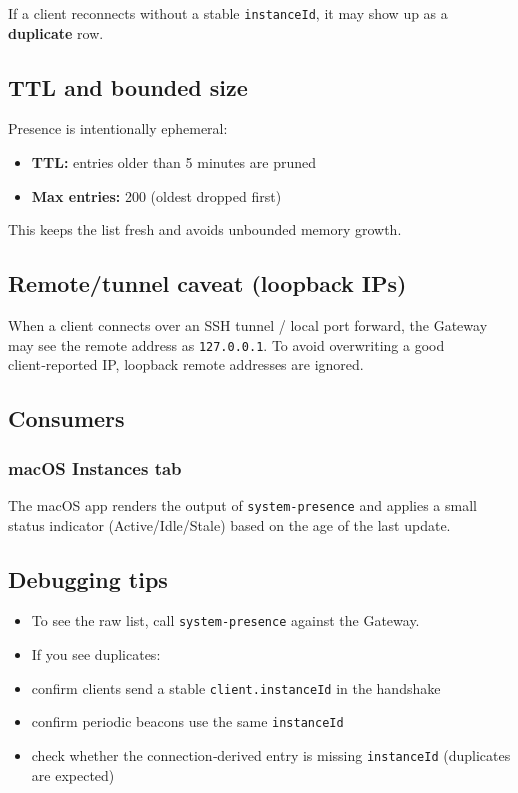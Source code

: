 If a client reconnects without a stable \texttt{instanceId}, it may show up as a
\textbf{duplicate} row.

\subsection{TTL and bounded size}


Presence is intentionally ephemeral:

\begin{itemize}
  \item \textbf{TTL:} entries older than 5 minutes are pruned
  \item \textbf{Max entries:} 200 (oldest dropped first)
\end{itemize}


This keeps the list fresh and avoids unbounded memory growth.

\subsection{Remote/tunnel caveat (loopback IPs)}


When a client connects over an SSH tunnel / local port forward, the Gateway may
see the remote address as \texttt{127.0.0.1}. To avoid overwriting a good client‑reported
IP, loopback remote addresses are ignored.

\subsection{Consumers}


\subsubsection{macOS Instances tab}


The macOS app renders the output of \texttt{system-presence} and applies a small status
indicator (Active/Idle/Stale) based on the age of the last update.

\subsection{Debugging tips}


\begin{itemize}
  \item To see the raw list, call \texttt{system-presence} against the Gateway.
  \item If you see duplicates:
  \item confirm clients send a stable \texttt{client.instanceId} in the handshake
  \item confirm periodic beacons use the same \texttt{instanceId}
  \item check whether the connection‑derived entry is missing \texttt{instanceId} (duplicates are expected)
\end{itemize}



